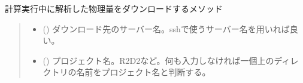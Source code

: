 \documentclass[letterpaper,10pt,dvipdfmx,report]{sphinxmanual}
\begin{document}
\begin{fulllineitems}
\label{\detokenize{io:R2D2.R2D2_data.sync_vc}}
\pysigstartsignatures
{}
\pysigstopsignatures
\sphinxAtStartPar
計算実行中に解析した物理量をダウンロードするメソッド
\begin{quote}\begin{description}
\begin{itemize}
\item {} 
\sphinxAtStartPar
{} () \sphinxhyphen{}\sphinxhyphen{} ダウンロード先のサーバー名。sshで使うサーバー名を用いれば良い。

\item {} 
\sphinxAtStartPar
{} () \sphinxhyphen{}\sphinxhyphen{} プロジェクト名。\textquotesingle{}R2D2\textquotesingle{}など。何も入力しなければ一個上のディレクトリの名前をプロジェクト名と判断する。

\end{itemize}

\end{description}\end{quote}

\end{fulllineitems}

\end{document}
